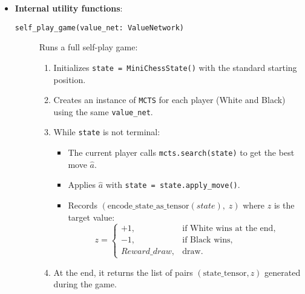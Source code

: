 \documentclass{report}
\begin{document}
\begin{itemize}
  \item \textbf{Internal utility functions}:
    \begin{description}
      \item[\texttt{self\_play\_game(value\_net: ValueNetwork)}]  
        Runs a full self-play game:
        \begin{enumerate}
          \item Initializes \texttt{state = MiniChessState()} with the standard starting position.
          \item Creates an instance of \texttt{MCTS} for each player (White and Black) using the same \texttt{value\_net}.
          \item While \texttt{state} is not terminal:
            \begin{itemize}
              \item The current player calls \texttt{mcts.search(state)} to get the best move \(\hat{a}\).
              \item Applies \(\hat{a}\) with \texttt{state = state.apply\_move()}.
              \item Records \((\text{encode\_state\_as\_tensor}(state), \; z)\) where \(z\) is the target value:
                \[
                  z = 
                  \begin{cases}
                    +1, & \text{if White wins at the end}, \\
                    -1, & \text{if Black wins}, \\
                    Reward\_draw, & \text{draw}.
                  \end{cases}
                \]
            \end{itemize}
          \item At the end, it returns the list of pairs \((\text{state\_tensor}, z)\) generated during the game.
        \end{enumerate}


\end{description}
\end{itemize}
\end{document}
